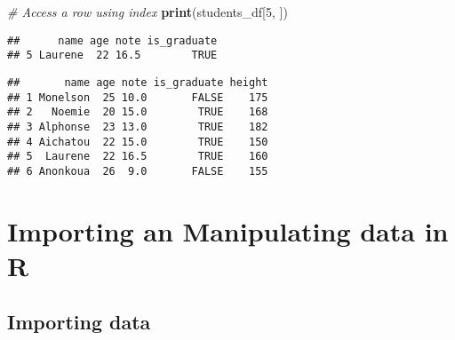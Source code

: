 \documentclass[
]{book}
\newenvironment{Shaded}{\begin{snugshade}}{\end{snugshade}}
\newcommand{\CommentTok}[1]{\textcolor[rgb]{0.56,0.35,0.01}{\textit{#1}}}
\newcommand{\DecValTok}[1]{\textcolor[rgb]{0.00,0.00,0.81}{#1}}
\newcommand{\FunctionTok}[1]{\textcolor[rgb]{0.13,0.29,0.53}{\textbf{#1}}}
\newcommand{\NormalTok}[1]{#1}
\newcommand{\OtherTok}[1]{\textcolor[rgb]{0.56,0.35,0.01}{#1}}
\newcommand{\SpecialCharTok}[1]{\textcolor[rgb]{0.81,0.36,0.00}{\textbf{#1}}}
\begin{document}
\begin{Shaded}
\begin{Highlighting}[]
\CommentTok{\# Access a row using index}
\FunctionTok{print}\NormalTok{(students\_df[}\DecValTok{5}\NormalTok{, ])}
\end{Highlighting}
\end{Shaded}

\begin{verbatim}
##      name age note is_graduate
## 5 Laurene  22 16.5        TRUE
\end{verbatim}

\begin{Shaded}
\end{Shaded}

\begin{verbatim}
##       name age note is_graduate height
## 1 Monelson  25 10.0       FALSE    175
## 2   Noemie  20 15.0        TRUE    168
## 3 Alphonse  23 13.0        TRUE    182
## 4 Aichatou  22 15.0        TRUE    150
## 5  Laurene  22 16.5        TRUE    160
## 6 Anonkoua  26  9.0       FALSE    155
\end{verbatim}

\section{Importing an Manipulating data in R}\label{importing-an-manipulating-data-in-r}

\subsection{Importing data}\label{importing-data}
\end{document}
